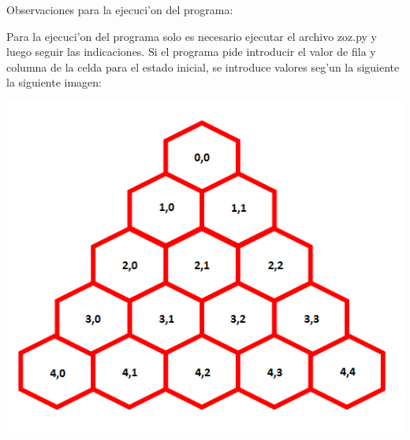 \documentclass[11pt]{article}
\begin{document}
\newpage

\begin{flushleft}
Observaciones para la ejecuci'on del programa: 
\end{flushleft}

\begin{flushleft}
Para la ejecuci'on del programa solo es necesario ejecutar el archivo zoz.py y luego seguir las indicaciones.
Si el programa pide introducir el valor de fila y columna de la celda para el estado inicial, se introduce valores seg'un la siguiente la siguiente imagen:
\end{flushleft}

\begin{center}
\includegraphics{tablero.png}
\end{center}
\end{document}
